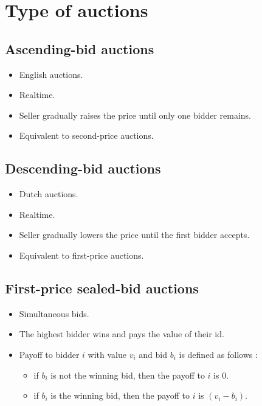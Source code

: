 \section{Type of auctions}

\subsection{Ascending-bid auctions}

\begin{itemize}
\item English auctions.
\item Realtime.
\item Seller gradually raises the price until only one bidder remains.
\item Equivalent to second-price auctions.
\end{itemize}

\subsection{Descending-bid auctions}

\begin{itemize}
\item Dutch auctions.
\item Realtime.
\item Seller gradually lowers the price until the first bidder accepts.
\item Equivalent to first-price auctions.
\end{itemize}

\subsection{First-price sealed-bid auctions}

\begin{itemize}
\item Simultaneous bids.
\item The highest bidder wins and pays the value of their id.
\item Payoff to bidder $i$ with value $v_i$ and bid $b_i$ is defined as follows :
	\begin{itemize}
	\item if $b_i$ is not the winning bid, then the payoff to $i$ is $0$.
	\item if $b_i$ is the winning bid, then the payoff to $i$ is $(v_i - b_i)$.
	\end{itemize}
\end{itemize}

